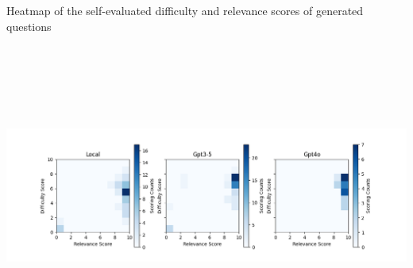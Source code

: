 {
	Heatmap of the self-evaluated difficulty and relevance scores of generated questions
    \begin{tikzfigure}
        \vspace*{-2.5cm}
        \hspace*{-1cm}
        \includegraphics[height=10cm]{figures/eval_plot.png}
    \end{tikzfigure}
    \vspace*{-2.5cm}
}


